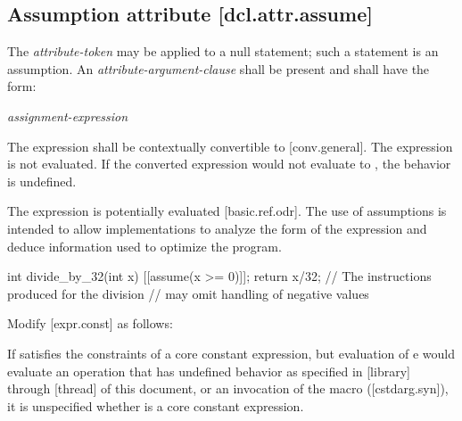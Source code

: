 \begin{adjustwidth}{0.5cm}{0.5cm}
\begin{addedblock}
\subsection*{Assumption attribute \hspace{7.33cm} [dcl.attr.assume]}

The \textit{attribute-token}  may be applied to a null statement; such a statement is an assumption. An \textit{attribute-argument-clause} shall be present and shall have the form:

\hspace{5mm}\tcode{( }\textit{assignment-expression}\tcode{ )}

The expression shall be contextually convertible to  [conv.general]. The expression is not evaluated. If the converted expression would not evaluate to , the behavior is undefined.

\begin{note}
The expression is potentially evaluated [basic.ref.odr]. The use of assumptions is intended to allow implementations to analyze the form of the expression and deduce information used to optimize the program.
\end{note}

\begin{example}
\begin{codeblock}
int divide_by_32(int x)  {
    [[assume(x >= 0)]];
    return x/32;   // The instructions produced for the division
                   //  may omit handling of negative values
}
\end{codeblock}
\end{example}
\end{addedblock}
\end{adjustwidth}

Modify [expr.const] as follows:

\begin{adjustwidth}{0.5cm}{0.5cm}
If  satisfies the constraints of a core constant expression, but evaluation of e would evaluate an operation that has undefined behavior as specified in [library] through [thread] of this document, or an invocation of the  macro ([cstdarg.syn]), it is unspecified whether  is a core constant expression.
\end{adjustwidth}

